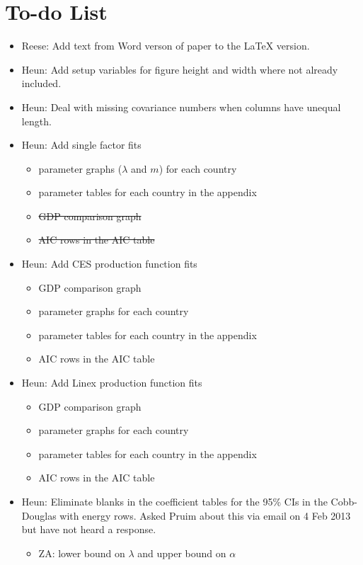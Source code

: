 \documentclass[preprint,authoryear,12pt]{elsarticle}\usepackage{graphicx, color}
\begin{document}
\section*{To-do List}
\begin{itemize}
\item Reese: Add text from Word verson of paper to the LaTeX version.
\item Heun: Add setup variables for figure height and width where not already included.
\item Heun: Deal with missing covariance numbers when columns have unequal length.
\item Heun: Add single factor fits
      \begin{itemize}
      \item parameter graphs ($\lambda$ and $m$) for each country
      \item parameter tables for each country in the appendix
      \item \st{GDP comparison graph}
      \item \st{AIC rows in the AIC table}
      \end{itemize}
\item Heun: Add CES production function fits
      \begin{itemize}
      \item GDP comparison graph
      \item parameter graphs for each country
      \item parameter tables for each country in the appendix
      \item AIC rows in the AIC table
      \end{itemize}
\item Heun: Add Linex production function fits
      \begin{itemize}
      \item GDP comparison graph
      \item parameter graphs for each country
      \item parameter tables for each country in the appendix
      \item AIC rows in the AIC table
      \end{itemize}
\item Heun: Eliminate blanks in the coefficient tables for the 95\% CIs in the Cobb-Douglas with energy rows. Asked Pruim about this via email on 4 Feb 2013 but have not heard a response.
      \begin{itemize}
      \item ZA: lower bound on $\lambda$ and upper bound on $\alpha$

\end{itemize}
\end{itemize}
\end{document}
